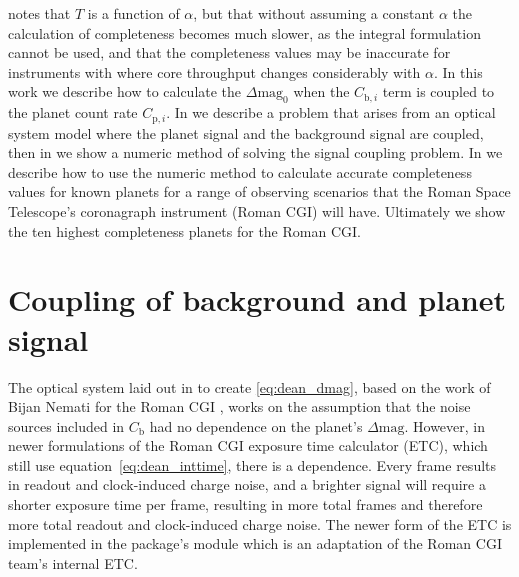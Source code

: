 \citet{keithlyOptimalScheduling2020} notes that $T$ is a function of $\alpha$, but
that without assuming a constant $\alpha$ the calculation of completeness becomes
much slower, as the integral formulation cannot be used, and that the
completeness values may be inaccurate for instruments with where core
throughput changes considerably with $\alpha$. In this work we describe how to
calculate the $\Delta\textrm{mag}_0$ when the $C_{\textrm{b},i}$ term is
coupled to the planet count rate $C_{\textrm{p},i}$. In  we describe a problem that arises from an optical
system model where the planet signal and the background signal are coupled,
then in  we show a numeric method of
solving the signal coupling problem. In  we describe
how to use the numeric method to calculate accurate completeness values for known
planets for a range of observing scenarios that the Roman Space Telescope's
coronagraph instrument (Roman CGI) will have. Ultimately we show the ten
highest completeness planets for the Roman CGI.




\section{Coupling of background and planet signal} %
\label{sec:Coupling of background and planet signal}

The optical system laid out in \citet{keithlyOptimalScheduling2020} to create
\ref{eq:dean_dmag}, based on the work of Bijan Nemati for the Roman CGI
\citep{Nemati2014, nematiSensitivityWFIRST2017, Nemati2020a}, works on the
assumption that the noise sources included in $C_{\textrm{b}}$ had no
dependence on the planet's $\Delta\textrm{mag}$. However, in newer formulations
of the Roman CGI exposure time calculator (ETC), which still use
equation~\ref{eq:dean_inttime}, there is a dependence. Every frame results in
readout and clock-induced charge noise, and a brighter signal will require a
shorter exposure time per frame, resulting in more total frames and therefore
more total readout and clock-induced charge noise. The newer form of the ETC is
implemented in the  package's  module
\cite{savranskyWFIRSTAFTACoronagraphScience2015} which is an adaptation of the
Roman CGI team's internal ETC.

